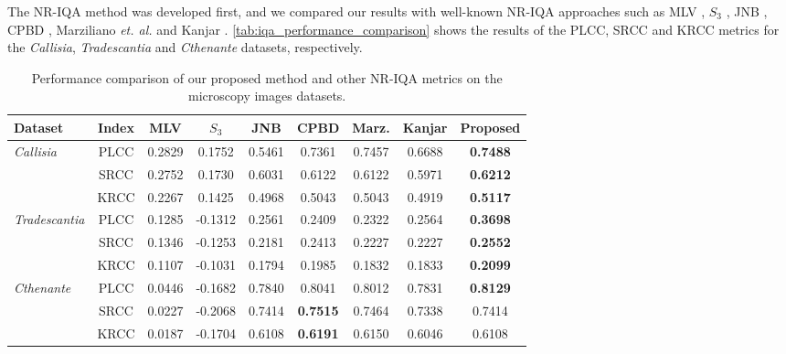 The NR-IQA method was developed first, and we compared our results with well-known NR-IQA approaches such as MLV \cite{bahrami2014fast}, $S_{3}$ \cite{vu2012s3}, JNB \cite{ferzli2009noreference}, CPBD \cite{narvekar2011noreference}, Marziliano \textit{et. al.} \cite{marziliano2002noreference} and Kanjar \cite{kanjar2013image}. \autoref{tab:iqa_performance_comparison} shows the results of the PLCC, SRCC and KRCC metrics for the \textit{Callisia}, \textit{Tradescantia} and \textit{Cthenante} datasets, respectively.


\begin{table}[ht]
    \centering
    \caption{Performance comparison of our proposed method and other NR-IQA metrics on the microscopy images datasets.}
    \label{tab:iqa_performance_comparison}
    \begin{tabular}{lcccccccc}
        \toprule
        Dataset & Index & MLV & $S_{3}$ & JNB & CPBD & Marz. & Kanjar & \textbf{Proposed}\\
        \midrule
        
        \multirow{3}{*}{\textit{\small Callisia}} 
        & \small PLCC & 0.2829 & 0.1752 & 0.5461 & 0.7361 & 0.7457 & 0.6688 & \textbf{0.7488}\\
        & \small SRCC & 0.2752 & 0.1730 & 0.6031 & 0.6122 & 0.6122 & 0.5971 & \textbf{0.6212}\\
        & \small KRCC & 0.2267 & 0.1425 & 0.4968 & 0.5043 & 0.5043 & 0.4919 & \textbf{0.5117}\\
        
        \midrule
        
        \multirow{3}{*}{\textit{\small Tradescantia}}
        & \small PLCC & 0.1285 & -0.1312 & 0.2561 & 0.2409 & 0.2322 & 0.2564 & \textbf{0.3698}\\
        & \small SRCC & 0.1346 & -0.1253 & 0.2181 & 0.2413 & 0.2227 & 0.2227 & \textbf{0.2552}\\
        & \small KRCC & 0.1107 & -0.1031 & 0.1794 & 0.1985 & 0.1832 & 0.1833 & \textbf{0.2099}\\

        \midrule
        
        \multirow{3}{*}{\textit{\small Cthenante}} 
        & \small PLCC & 0.0446 & -0.1682 & 0.7840 & 0.8041 & 0.8012 & 0.7831 & \textbf{0.8129}\\
        & \small SRCC & 0.0227 & -0.2068 & 0.7414 & \textbf{0.7515} & 0.7464 & 0.7338 & 0.7414\\
        & \small KRCC & 0.0187 & -0.1704 & 0.6108 & \textbf{0.6191} & 0.6150 & 0.6046 & 0.6108\\
        
        \bottomrule
    \end{tabular}
    \centering
    \fautor
\end{table}


